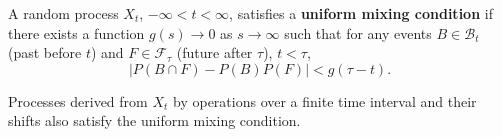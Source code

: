 A random process $X_t$, $-\infty < t < \infty$, satisfies a \textbf{uniform mixing condition} if there exists a function $g(s) \to 0$ as $s \to \infty$ such that for any events $B \in \mathcal{B}_t$ (past before $t$) and $F \in \mathcal{F}_\tau$ (future after $\tau$), $t < \tau$,
$$|P(B \cap F) - P(B) P(F)| < g(\tau - t).$$

Processes derived from $X_t$ by operations over a finite time interval and their shifts also satisfy the uniform mixing condition.
